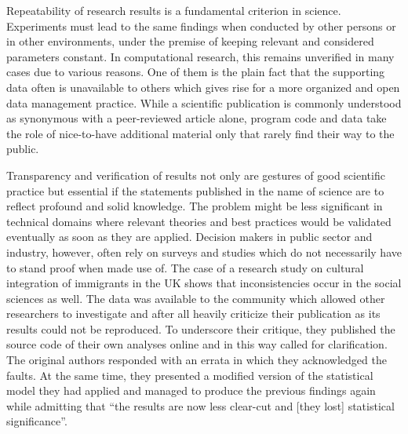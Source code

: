 \documentclass{acm_proc_article-sp}
\begin{document}
Repeatability of research results is a fundamental criterion in science. %
Experiments must lead to the same findings when conducted by other persons or in other environments, under the premise of keeping relevant and considered parameters constant.
In computational research, this remains unverified in many cases due to various reasons.
\cite{peng2011reproducible}
One of them is the plain fact that the supporting data often is unavailable to others which gives rise for a more organized and open data management practice. \cite{Wood1298248}
While a scientific publication is commonly understood as synonymous with a peer-reviewed article alone, program code and data take the role of nice-to-have additional material only that rarely find their way to the public.




Transparency and verification of results not only are gestures of good scientific practice but essential if the statements published in the name of science are to reflect profound and solid knowledge.
The problem might be less significant in technical domains where relevant theories and best practices would be validated eventually as soon as they are applied.
Decision makers in public sector and industry, however, often rely on surveys and studies which do not necessarily have to stand proof when made use of. 
The case of a research study on cultural integration of immigrants in the UK  
shows that inconsistencies occur in the social sciences as well.
The data was available to the community \cite{dataset_FNSEM} which allowed other researchers to investigate and after all heavily criticize their publication as its results could not be reproduced. \cite{arai2011fragile}
To underscore their critique, they published the source code of their own analyses online and in this way called for clarification. %
The original authors responded with an errata in which they acknowledged the faults.
At the same time, they presented a modified version of the statistical model they had applied and managed to produce the previous findings again while admitting that ``the results are now less clear-cut and [they lost] statistical significance''. \cite{bisin2011errata} 
%
%
 
\end{document}
